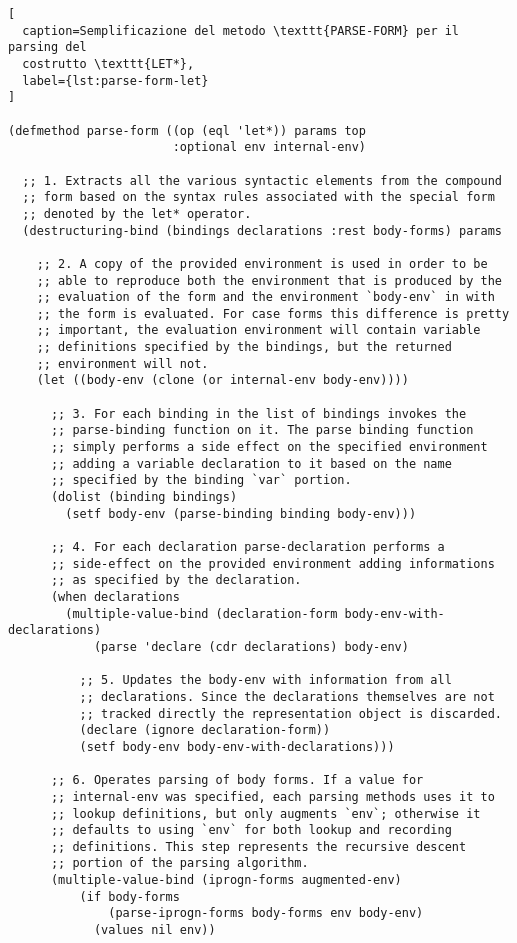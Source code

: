 \begin{lstlisting}[
  caption=Semplificazione del metodo \texttt{PARSE-FORM} per il parsing del
  costrutto \texttt{LET*},
  label={lst:parse-form-let}
]

(defmethod parse-form ((op (eql 'let*)) params top
                       :optional env internal-env)

  ;; 1. Extracts all the various syntactic elements from the compound
  ;; form based on the syntax rules associated with the special form
  ;; denoted by the let* operator.
  (destructuring-bind (bindings declarations :rest body-forms) params

    ;; 2. A copy of the provided environment is used in order to be
    ;; able to reproduce both the environment that is produced by the
    ;; evaluation of the form and the environment `body-env` in with
    ;; the form is evaluated. For case forms this difference is pretty
    ;; important, the evaluation environment will contain variable
    ;; definitions specified by the bindings, but the returned
    ;; environment will not.
    (let ((body-env (clone (or internal-env body-env))))

      ;; 3. For each binding in the list of bindings invokes the
      ;; parse-binding function on it. The parse binding function
      ;; simply performs a side effect on the specified environment
      ;; adding a variable declaration to it based on the name
      ;; specified by the binding `var` portion.
      (dolist (binding bindings)
        (setf body-env (parse-binding binding body-env)))

      ;; 4. For each declaration parse-declaration performs a
      ;; side-effect on the provided environment adding informations
      ;; as specified by the declaration.
      (when declarations
        (multiple-value-bind (declaration-form body-env-with-declarations)
            (parse 'declare (cdr declarations) body-env)

          ;; 5. Updates the body-env with information from all
          ;; declarations. Since the declarations themselves are not
          ;; tracked directly the representation object is discarded.
          (declare (ignore declaration-form))
          (setf body-env body-env-with-declarations)))

      ;; 6. Operates parsing of body forms. If a value for
      ;; internal-env was specified, each parsing methods uses it to
      ;; lookup definitions, but only augments `env`; otherwise it
      ;; defaults to using `env` for both lookup and recording
      ;; definitions. This step represents the recursive descent
      ;; portion of the parsing algorithm.
      (multiple-value-bind (iprogn-forms augmented-env)
          (if body-forms
              (parse-iprogn-forms body-forms env body-env)
            (values nil env))


\end{lstlisting}
